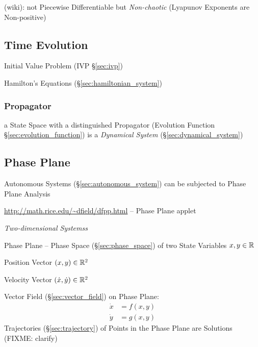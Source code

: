 (wiki): not Piecewise Differentiable but \emph{Non-chaotic} (Lyapunov Exponents
are Non-positive)




\subsection{Time Evolution}\label{sec:time_evolution}

\fist Initial Value Problem (IVP \S\ref{sec:ivp})

Hamilton's Equations (\S\ref{sec:hamiltonian_system})



\subsubsection{Propagator}\label{sec:propagator}

a State Space with a distinguished Propagator (Evolution Function
\S\ref{sec:evolution_function}) is a \emph{Dynamical System}
(\S\ref{sec:dynamical_system})



\subsection{Phase Plane}\label{sec:phase_plane}


Autonomous Systems (\S\ref{sec:autonomous_system}) can be subjected to Phase
Plane Analysis

\url{http://math.rice.edu/~dfield/dfpp.html} -- Phase Plane applet

\emph{Two-dimensional Systemss}

Phase Plane -- Phase Space (\S\ref{sec:phase_space}) of two State Variables
$x,y \in \mathbb{R}$

Position Vector $(x,y) \in \mathbb{R}^2$

Velocity Vector $(\dot{x},\dot{y}) \in \mathbb{R}^2$

Vector Field (\S\ref{sec:vector_field}) on Phase Plane:
\begin{align*}
  \dot{x} & = f(x,y) \\
  \dot{y} & = g(x,y)
\end{align*}
Trajectories (\S\ref{sec:trajectory}) of Points in the Phase Plane are
Solutions (FIXME: clarify)

